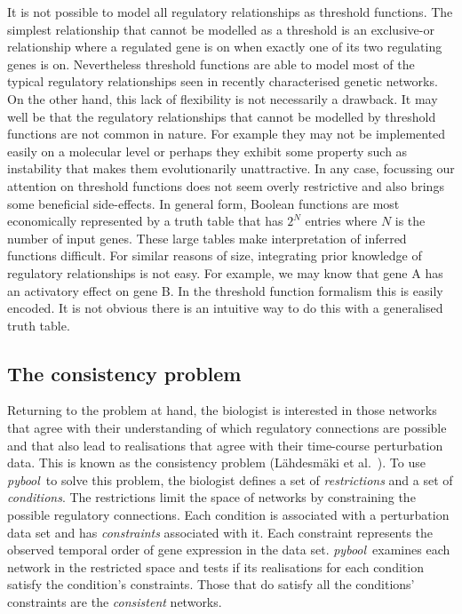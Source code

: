 \documentclass{article}
\newcommand{\pybool}{\emph{pybool}}
\begin{document}
It is not possible to model all regulatory relationships as threshold functions. The simplest relationship that cannot be modelled as a threshold is an exclusive-or relationship where a regulated gene is on when exactly one of its two regulating genes is on. Nevertheless threshold functions are able to model most of the typical regulatory relationships seen in recently characterised genetic networks. On the other hand, this lack of flexibility is not necessarily a drawback. It may well be that the regulatory relationships that cannot be modelled by threshold functions are not common in nature. For example they may not be implemented easily on a molecular level or perhaps they exhibit some property such as instability that makes them evolutionarily unattractive. In any case, focussing our attention on threshold functions does not seem overly restrictive and also brings some beneficial side-effects. In general form, Boolean functions are most economically represented by a truth table that has \(2^N\) entries where \(N\) is the number of input genes. These large tables make interpretation of inferred functions difficult. For similar reasons of size, integrating prior knowledge of regulatory relationships is not easy. For example, we may know that gene A has an activatory effect on gene B. In the threshold function formalism this is easily encoded. It is not obvious there is an intuitive way to do this with a generalised truth table.




\subsection{The consistency problem}
Returning to the problem at hand, the biologist is interested in those networks that agree with their understanding of which regulatory connections are possible and that also lead to realisations that agree with their time-course perturbation data. This is known as the consistency problem (L\"{a}hdesm\"{a}ki et al.~\cite{Lahdesmaki2003}). To use \pybool\ to solve this problem, the biologist defines a set of \emph{restrictions} and a set of \emph{conditions}. The restrictions limit the space of networks by constraining the possible regulatory connections. Each condition is associated with a perturbation data set and has \emph{constraints} associated with it. Each constraint represents the observed temporal order of gene expression in the data set. \pybool\ examines each network in the restricted space and tests if its realisations for each condition satisfy the condition's constraints. Those that do satisfy all the conditions' constraints are the \emph{consistent} networks.
\end{document}
